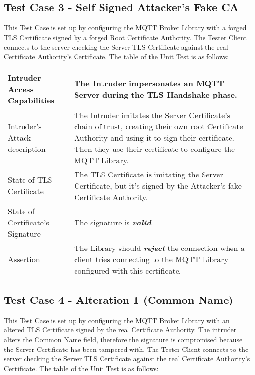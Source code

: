 \documentclass[binding=0.6cm,noexaminfo]{sapthesis}
\begin{document}
\subsection{Test Case 3 - Self Signed Attacker's Fake CA}
This Test Case is set up by configuring the MQTT Broker Library with a forged TLS Certificate signed by a forged Root Certificate Authority. The Tester Client connects to the server checking the Server TLS Certificate against the real Certificate Authority’s Certificate. The table of the Unit Test is as follows:

\begin{center}
\begin{tabular}{| p{6cm} | p{6cm} |}
\hline
Intruder Access Capabilities & The Intruder impersonates an MQTT Server during the TLS Handshake phase. \\
\hline
Intruder’s Attack description & The Intruder imitates the Server Certificate’s chain of trust, creating their own root Certificate Authority and using it to sign their certificate. Then they use their certificate to configure the MQTT Library. \\
\hline
State of TLS Certificate & The TLS Certificate is imitating the Server Certificate, but it’s signed by the Attacker’s fake Certificate Authority. \\
\hline
State of Certificate’s Signature & The signature is \textbf{\textit{valid}} \\
\hline
Assertion & The Library should \textbf{\textit{reject}} the connection when a client tries connecting to the MQTT Library configured with this certificate. \\
\hline
\end{tabular}
\end{center}

\subsection{Test Case 4 - Alteration 1 (Common Name)}
This Test Case is set up by configuring the MQTT Broker Library with an altered TLS Certificate signed by the real Certificate Authority. The intruder alters the Common Name field, therefore the signature is compromised because the Server Certificate has been tampered with. The Tester Client connects to the server checking the Server TLS Certificate against the real Certificate Authority’s Certificate. The table of the Unit Test is as follows:
\end{document}
